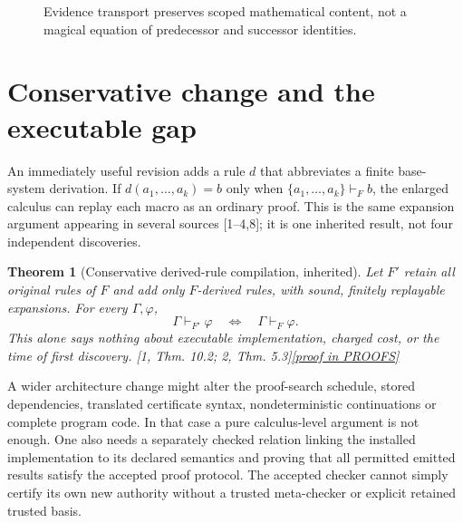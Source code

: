 \documentclass[11pt,letterpaper]{article}
\newtheorem{theorem}{Theorem}[section]
\theoremstyle{definition}
\theoremstyle{remark}
\newcommand{\prooflink}[1]{\hfill\hyperlink{proof:#1}{\footnotesize[proof in PROOFS]}}
\newcommand{\src}[1]{\textup{[#1]}}
\begin{document}
\begin{figure}[htbp]\centering
{}
\caption{Evidence transport preserves scoped mathematical content, not a magical equation of predecessor and successor identities.}\end{figure}

\section{Conservative change and the executable gap}
An immediately useful revision adds a rule $d$ that abbreviates a finite base-system derivation. If $d(a_1,\ldots,a_k)=b$ only when $\{a_1,\ldots,a_k\}\vdash_F b$, the enlarged calculus can replay each macro as an ordinary proof. This is the same expansion argument appearing in several sources \src{1--4,8}; it is one inherited result, not four independent discoveries.

\begin{theorem}[Conservative derived-rule compilation, inherited]\label{thm:conservative}\hypertarget{claim:conservative}{}
Let $F'$ retain all original rules of $F$ and add only $F$-derived rules, with sound, finitely replayable expansions. For every $\Gamma,\varphi$, 
\[
 \Gamma\vdash_{F'}\varphi\quad\Longleftrightarrow\quad\Gamma\vdash_F\varphi.
\]
This alone says nothing about executable implementation, charged cost, or the time of first discovery. \src{1, Thm. 10.2; 2, Thm. 5.3}\prooflink{conservative}
\end{theorem}

A wider architecture change might alter the proof-search schedule, stored dependencies, translated certificate syntax, nondeterministic continuations or complete program code. In that case a pure calculus-level argument is not enough. One also needs a separately checked relation linking the installed implementation to its declared semantics and proving that all permitted emitted results satisfy the accepted proof protocol. The accepted checker cannot simply certify its own new authority without a trusted meta-checker or explicit retained trusted basis.
\end{document}
